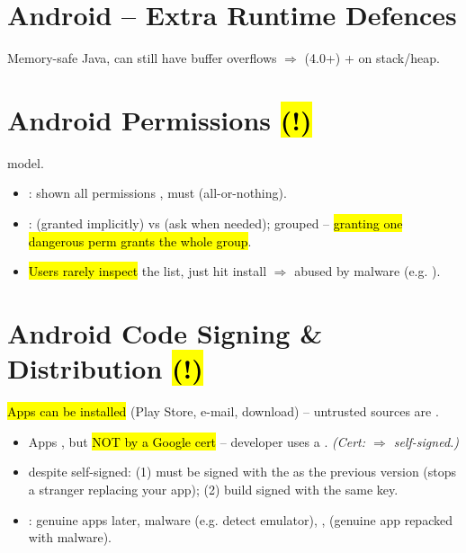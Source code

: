 \section{Android -- Extra Runtime Defences}
Memory-safe Java,  can still have buffer overflows $\Rightarrow$  (4.0+) +  on stack/heap.

\section{Android Permissions \hl{(!)}}
 model.
\begin{itemize}
\item {}: shown all permissions , must  (all-or-nothing).
\item {}:  (granted implicitly) vs  (ask when needed); grouped -- \hl{granting one dangerous perm grants the whole group}.
\item \hl{Users rarely inspect} the list, just hit install $\Rightarrow$ abused by malware (e.g. ).
\end{itemize}

\section{Android Code Signing \& Distribution \hl{(!)}}
\hl{Apps can be installed } (Play Store, e-mail, download) -- untrusted sources are .
\begin{itemize}
\item Apps , but \hl{NOT by a Google cert} -- developer uses a . \textit{(Cert:  $\Rightarrow$ self-signed.)}
\item {} despite self-signed: (1)  must be signed with the  as the previous version (stops a stranger replacing your app); (2) build  signed with the same key.
\item {}: genuine apps  later, malware  (e.g. detect emulator), ,  (genuine app repacked with malware).
\end{itemize}

